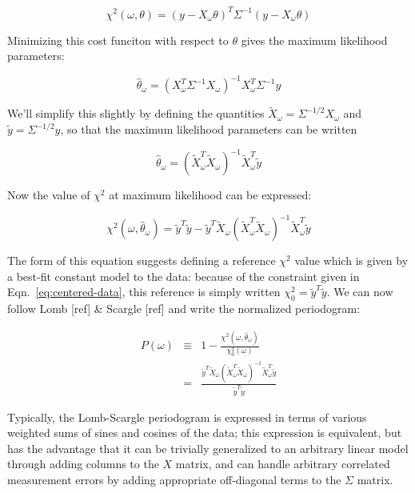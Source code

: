\documentclass[12pt,preprint]{aastex}
\begin{document}
\begin{equation}
  \chi^2(\omega, \theta) = (y - X_\omega\theta)^T\Sigma^{-1}(y - X_\omega\theta)
\end{equation}

Minimizing this cost funciton with respect to $\theta$ gives the maximum likelihood parameters:

\begin{equation}
\hat{\theta}_\omega = (X_\omega^T\Sigma^{-1}X_\omega)^{-1}X_\omega^T\Sigma^{-1}y
\end{equation}

We'll simplify this slightly by defining the quantities $\tilde{X}_\omega = \Sigma^{-1/2}X_\omega$ and $\tilde{y} = \Sigma^{-1/2}y$, so that the maximum likelihood parameters can be written

\begin{equation}
  \hat{\theta}_\omega = (\tilde{X}_\omega^T\tilde{X}_\omega)^{-1}\tilde{X}_\omega^T\tilde{y}
\end{equation}

Now the value of $\chi^2$ at maximum likelihood can be expressed:

\begin{equation}
  \chi^2(\omega, \hat{\theta}_\omega) = \tilde{y}^T\tilde{y} - \tilde{y}^T\tilde{X}_\omega(\tilde{X}_\omega^T\tilde{X}_\omega)^{-1}\tilde{X}_\omega^T \tilde{y}
\end{equation}

The form of this equation suggests defining a reference $\chi^2$ value which is given by a best-fit constant model to the data: because of the constraint given in Eqn.~\ref{eq:centered-data}, this reference is simply written $\chi^2_0 = \tilde{y}^T\tilde{y}$. We can now follow Lomb [ref] \& Scargle [ref] and write the normalized periodogram:

\begin{eqnarray}
  \label{eq:power}
  P(\omega) &\equiv& 1 -\frac{\chi^2(\omega, \hat{\theta}_\omega)}{\chi^2_0(\omega)}\\ &=& \frac{\tilde{y}^T\tilde{X}_\omega(\tilde{X}_\omega^T\tilde{X}_\omega)^{-1}\tilde{X}_\omega^T \tilde{y}}{\tilde{y}^T\tilde{y}}
\end{eqnarray}

Typically, the Lomb-Scargle periodogram is expressed in terms of various weighted sums of sines and cosines of the data; this expression is equivalent, but has the advantage that it can be trivially generalized to an arbitrary linear model through adding columns to the $X$ matrix, and can handle arbitrary correlated measurement errors by adding appropriate off-diagonal terms to the $\Sigma$ matrix.
\end{document}
